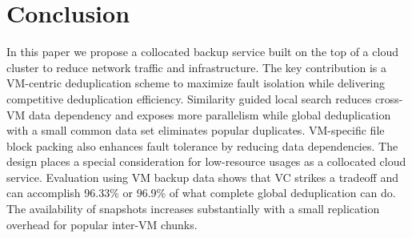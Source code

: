 \section{Conclusion}
\label{sect:conclusion}
In this paper we propose a collocated backup service built on
the top of a cloud cluster to reduce network traffic and infrastructure.
The key contribution is a VM-centric deduplication scheme to 
maximize fault isolation while delivering competitive deduplication efficiency.
Similarity guided local search reduces cross-VM data dependency and exposes more parallelism  
while global deduplication with a small common data set eliminates popular duplicates.
VM-specific file block packing also enhances fault tolerance by reducing data dependencies.
The design places a special consideration for low-resource usages as a collocated cloud service.
Evaluation using  VM backup data shows that VC strikes a tradeoff and 
can accomplish 96.33\% or 96.9\% of what complete global
deduplication can do.  The availability of snapshots increases substantially with 
a small replication overhead for popular inter-VM chunks.

